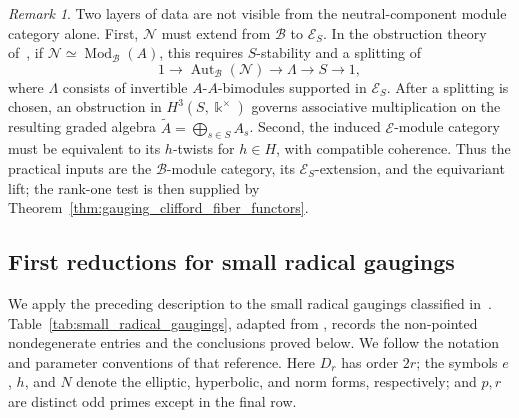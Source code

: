 \documentclass[12pt]{amsart}
\theoremstyle{plain}
\theoremstyle{definition} %
\theoremstyle{remark} %
\newtheorem{remark}[theorem]{Remark}
\newcommand{\ku}{{\Bbbk}} %
\newcommand{\cB}{\mathcal{B}}
\newcommand{\cE}{\mathcal{E}}
\newcommand{\cN}{\mathcal{N}}
\newcommand{\Aut}{\operatorname{Aut}}
\newcommand{\Mod}{\operatorname{Mod}}
\begin{document}
\begin{remark}
Two layers of data are not visible from the neutral-component module category
alone. First, \(\cN\) must extend from \(\cB\) to \(\cE_S\). In the
obstruction theory of~\cite{MeMu12}, if
\(\cN\simeq\Mod_{\cB}(A)\), this requires \(S\)-stability and a splitting of
\[
1\longrightarrow\Aut_{\cB}(\cN)
\longrightarrow\Lambda\longrightarrow S\longrightarrow1,
\]
where \(\Lambda\) consists of invertible \(A\)-\(A\)-bimodules supported in
\(\cE_S\). After a splitting is chosen, an obstruction in
\(H^3(S,\ku^\times)\) governs associative multiplication on the resulting
graded algebra \(\widetilde A=\bigoplus_{s\in S}A_s\). Second, the induced
\(\cE\)-module category must be equivalent to its \(h\)-twists for
\(h\in H\), with compatible coherence. Thus the practical inputs are the
\(\cB\)-module category, its \(\cE_S\)-extension, and the equivariant lift;
the rank-one test is then supplied by Theorem~\ref{thm:gauging_clifford_fiber_functors}.
\end{remark}

\subsection{First reductions for small radical gaugings}

We apply the preceding description to the small radical gaugings classified
in~\cite{GNradical}. Table~\ref{tab:small_radical_gaugings}, adapted from
\cite[Table~3]{GNradical}, records the non-pointed nondegenerate entries and
the conclusions proved below. We follow the notation and parameter conventions
of that reference. Here \(D_r\) has order \(2r\); the symbols \(e\), \(h\), and
\(N\) denote the elliptic, hyperbolic, and norm forms, respectively; and
\(p,r\) are distinct odd primes except in the final row.
\end{document}
